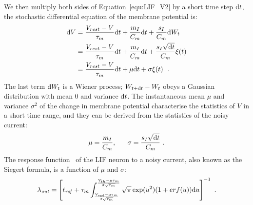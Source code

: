	We then multiply both sides of Equation~\ref{equ:LIF_V2} by a short time step $\mathrm{d} t$, the stochastic differential equation of the membrane potential is: %
	\begin{equation}
	\begin{aligned}
	\mathrm{d} V&= \frac{V_{rest} - V}{\tau_m }\mathrm{d} t + \frac{m_I}{C_m} \mathrm{d} t + \frac{s_I}{C_m}  \mathrm{d} W_t \\
	&=\frac{V_{rest} - V}{\tau_m }\mathrm{d} t + \frac{m_I}{C_m} \mathrm{d} t + \frac{s_I \sqrt{\mathrm{d} t}}{C_m} \xi(t)  \\
	&=\frac{V_{rest} - V}{\tau_m }\mathrm{d} t + \mu \mathrm{d} t + \sigma \xi(t) ~~. 
	\end{aligned}
	\end{equation}	
	The last term $\mathrm{d} W_t$ is a Wiener process; $W_{t +\mathrm{d} t} - W_{t}$ obeys a Gaussian distribution with mean 0 and variance $\mathrm{d} t$.
	The instantaneous mean $\mu$ and variance $\sigma^2$ of the change in membrane potential characterise the statistics of $V$ in a short time range, and they can be derived from the statistics of the noisy current:
	\begin{equation}
	\mu =\dfrac{m_I}{C_m}, ~~~~~ \sigma = \dfrac{s_I \sqrt{\mathrm{d} t}}{C_m}~.
	\end{equation}
	The response function~\citep{rauch2003neocortical,la2008response} of the LIF neuron to a noisy current, also known as the Siegert formula, is a function of $\mu$ and $\sigma$:
	\begin{equation}
	\lambda_\mathit{out}=
	\left [ t_\mathit{ref}+\tau_m \int_{\frac{V_\mathit{rest}-\mu \tau_m }{\sigma \sqrt{\tau_m}}}^{\frac{V_{th}-\mu \tau_m }{\sigma \sqrt{\tau_m}}} \sqrt{\pi} \exp(u^{2}) (1+erf(u)) \mathrm{d} u \right ]^{-1} ~.
	\label{equ:siegert}
	\end{equation}
	

